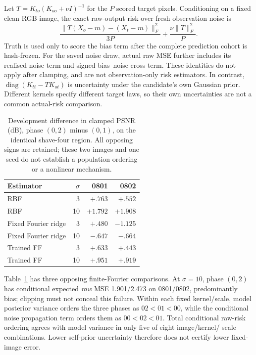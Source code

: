Let $T=K_{to}(K_{oo}+\nu I)^{-1}$ for the $P$ scored target pixels.
Conditioning on a fixed clean RGB image, the exact raw-output risk over
fresh observation noise is
\begin{equation*}
\frac{\|T(X_o-m)-(X_t-m)\|_F^2}{3P}
+\frac{\nu\|T\|_F^2}{P}.
\end{equation*}
Truth is used only to score the bias term after the complete prediction
cohort is hash-frozen. For the saved noise draw, actual raw MSE further
includes its realised noise term and signed bias--noise cross term.
These identities do not apply after clamping, and are not observation-only
risk estimators. In contrast, $\operatorname{diag}(K_{tt}-TK_{ot})$ is
uncertainty under the candidate's own Gaussian prior. Different kernels
specify different target laws, so their own uncertainties are not a common
actual-risk comparison.

\begin{table}[t]
\centering\small
\begin{tabular}{lrrr}
\toprule
Estimator & $\sigma$ & 0801 & 0802 \\
\midrule
RBF & 3 & $+.763$ & $+.552$ \\
RBF & 10 & $+1.792$ & $+1.908$ \\
Fixed Fourier ridge & 3 & $+.480$ & $-1.125$ \\
Fixed Fourier ridge & 10 & $-.647$ & $-.664$ \\
Trained FF & 3 & $+.633$ & $+.443$ \\
Trained FF & 10 & $+.951$ & $+.919$ \\
\bottomrule
\end{tabular}
\caption{Development difference in clamped PSNR (dB), phase $(0,2)$ minus
$(0,1)$, on the identical shave-four region. All opposing signs are
retained; these two images and one seed do not establish a population
ordering or a nonlinear mechanism.}\label{tab:controls}
\end{table}

Table~\ref{tab:controls} has three opposing finite-Fourier comparisons.
At $\sigma=10$, phase $(0,2)$ has conditional expected \emph{raw} MSE
1.901/2.473 on 0801/0802, predominantly bias; clipping must not conceal
this failure. Within each fixed kernel/scale, model posterior variance
orders the three phases as $02<01<00$, while the conditional noise
propagation term orders them as $00<02<01$. Total conditional raw-risk
ordering agrees with model variance in only five of eight image/kernel/
scale combinations. Lower self-prior uncertainty therefore does not
certify lower fixed-image error.


